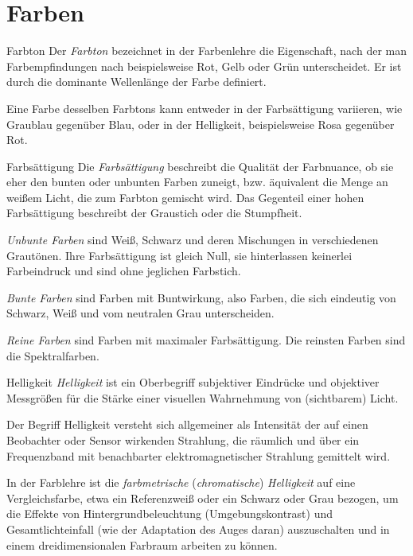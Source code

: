 \section{Farben}

\begin{defi}{Farbton}
    Der \emph{Farbton} bezeichnet in der Farbenlehre die Eigenschaft, nach der man Farbempfindungen nach beispielsweise Rot, Gelb oder Grün unterscheidet.
    Er ist durch die dominante Wellenlänge der Farbe definiert.

    Eine Farbe desselben Farbtons kann entweder in der Farbsättigung variieren, wie Graublau gegenüber Blau, oder in der Helligkeit, beispielsweise Rosa gegenüber Rot.
\end{defi}

\begin{defi}{Farbsättigung}
    Die \emph{Farbsättigung} beschreibt die Qualität der Farbnuance, ob sie eher den bunten oder unbunten Farben zuneigt, bzw. äquivalent die Menge an weißem Licht, die zum Farbton gemischt wird.
    Das Gegenteil einer hohen Farbsättigung beschreibt der Graustich oder die Stumpfheit.

    \emph{Unbunte Farben} sind Weiß, Schwarz und deren Mischungen in verschiedenen Grautönen.
    Ihre Farbsättigung ist gleich Null, sie hinterlassen keinerlei Farbeindruck und sind ohne jeglichen Farbstich.

    \emph{Bunte Farben} sind Farben mit Buntwirkung, also Farben, die sich eindeutig von Schwarz, Weiß und vom neutralen Grau unterscheiden.

    \emph{Reine Farben} sind Farben mit maximaler Farbsättigung.
    Die reinsten Farben sind die Spektralfarben.
\end{defi}

\begin{defi}{Helligkeit}
    \emph{Helligkeit} ist ein Oberbegriff subjektiver Eindrücke und objektiver Messgrößen für die Stärke einer visuellen Wahrnehmung von (sichtbarem) Licht.

    Der Begriff Helligkeit versteht sich allgemeiner als Intensität der auf einen Beobachter oder Sensor wirkenden Strahlung, die räumlich und über ein Frequenzband mit benachbarter elektromagnetischer Strahlung gemittelt wird.

    In der Farblehre ist die \emph{farbmetrische} (\emph{chromatische}) \emph{Helligkeit} auf eine Vergleichsfarbe, etwa ein Referenzweiß oder ein Schwarz oder Grau bezogen, um die Effekte von Hintergrundbeleuchtung (Umgebungskontrast) und Gesamtlichteinfall (wie der Adaptation des Auges daran) auszuschalten und in einem dreidimensionalen Farbraum arbeiten zu können.
\end{defi}

